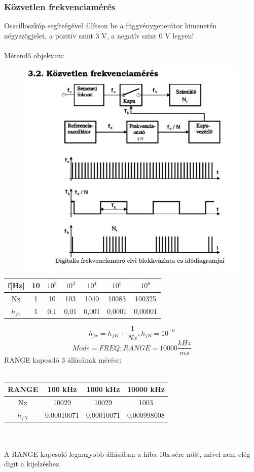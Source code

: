 \documentclass[10pt,a4paper]{article}
\begin{document}
		\subsubsection{Közvetlen frekvenciamérés}
		Oszcilloszkóp segítségével állítson be a függvénygenerátor kimenetén
négyszögjelet, a pozitív szint 3 V, a negatív szint 0 V legyen!
		\\\\
		Mérendő objektum:
		\begin{figure}[hbtp]
		\centering
		\includegraphics[scale=0.3]{teljes/kozv_frekvencia.png}
		\caption{}
		\end{figure}
		\newpage\begin{tabular}{|c|c|c|c|c|c|c|}
		\hline 
		f[Hz] & 10 & $10^2$ & $10^3$ & $10^4$ & $10^5$ & $10^6$ \\ 
		\hline 
		Nx & 1 & 10 & 103 & 1040 & 10083 & 100325 \\ 
		\hline 
		$h_{fx}$ & 1 & 0,1 & 0,01 & 0,001 & 0,0001 & 0,00001 \\ 
		\hline 
		\end{tabular} 
		$$h_{fx} = h_{fR} + \frac{1}{Nx}; h_{fR} = 10^{-6}$$
		$$Mode=FREQ; RANGE=10000 \frac{kHz}{ms}$$
		RANGE kapcsoló 3 állásának mérése:\\\\
		\begin{tabular}{|c|c|c|c|}
		\hline 
		RANGE & 100 kHz & 1000 kHz & 10000 kHz \\ 
		\hline 
		Nx & 10029 & 10029 & 1003 \\ 
		\hline 
		$h_{fX}$ & 0,00010071 & 0,00010071 & 0,000998008 \\ 
		\hline 
		\end{tabular} 
		\\\\A RANGE kapcsoló legnagyobb állásában a hiba 10x-sére nőtt, mivel nem elég digit a kijelzéshez.
\end{document}
